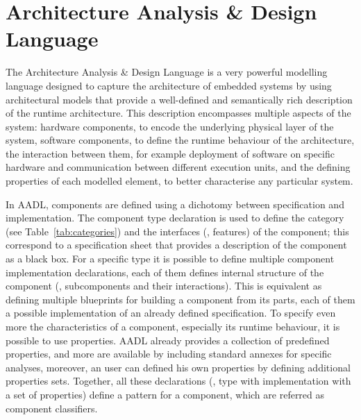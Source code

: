 \chapter[Architecture Analysis \& Design Language]{Architecture Analysis \& Design Language}\label{ch:AADL}

The Architecture Analysis \& Design Language is a very powerful modelling language designed to capture the architecture of embedded systems by using architectural models that provide a well-defined and semantically rich description of the runtime architecture. This description encompasses multiple aspects of the system: hardware components, to encode the underlying physical layer of the system, software components, to define the runtime behaviour of the architecture, the interaction between them, for example deployment of software on specific hardware and communication between different execution units, and the defining properties of each modelled element, to better characterise any particular system.

In AADL, components are defined using a dichotomy between specification and implementation. The component type declaration is used to define the category (see Table~\ref{tab:categories}) and the interfaces (\ie, features) of the component; this correspond to a specification sheet that provides a description of the component as a black box. For a specific type it is possible to define multiple component implementation declarations, each of them defines internal structure of the component (\ie, subcomponents and their interactions). This is equivalent as defining multiple blueprints for building a component from its parts, each of them a possible implementation of an already defined specification. To specify even more the characteristics of a component, especially its runtime behaviour, it is possible to use properties. AADL already provides a collection of predefined properties, and more are available by including standard annexes for specific analyses, moreover, an user can defined his own properties by defining additional properties sets. Together, all these declarations (\ie, type with implementation with a set of properties) define a pattern for a component, which are referred as component classifiers.
 
